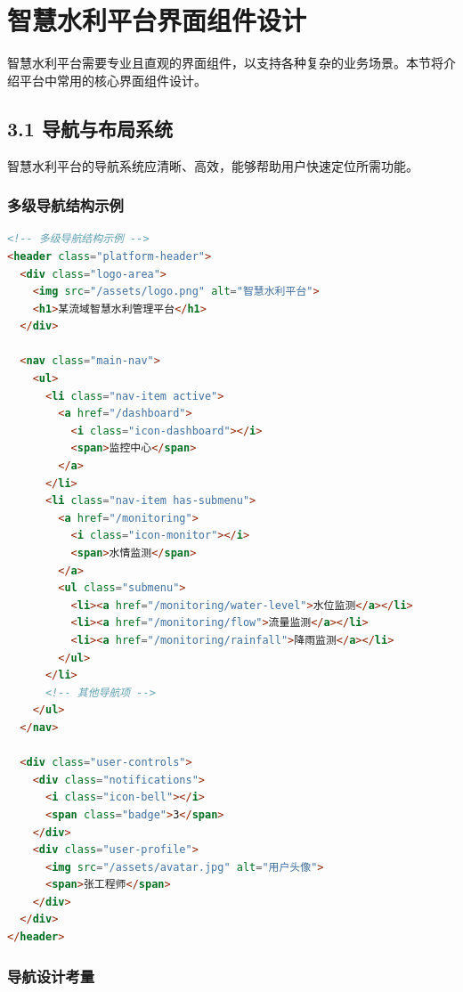 \section{智慧水利平台界面组件设计}\label{ux667aux6167ux6c34ux5229ux5e73ux53f0ux754cux9762ux7ec4ux4ef6ux8bbeux8ba1}

智慧水利平台需要专业且直观的界面组件，以支持各种复杂的业务场景。本节将介绍平台中常用的核心界面组件设计。

\subsection{3.1
导航与布局系统}\label{ux5bfcux822aux4e0eux5e03ux5c40ux7cfbux7edf}

智慧水利平台的导航系统应清晰、高效，能够帮助用户快速定位所需功能。

\subsubsection{多级导航结构示例}\label{ux591aux7ea7ux5bfcux822aux7ed3ux6784ux793aux4f8b}

\begin{lstlisting}[language=HTML]
<!-- 多级导航结构示例 -->
<header class="platform-header">
  <div class="logo-area">
    <img src="/assets/logo.png" alt="智慧水利平台">
    <h1>某流域智慧水利管理平台</h1>
  </div>
  
  <nav class="main-nav">
    <ul>
      <li class="nav-item active">
        <a href="/dashboard">
          <i class="icon-dashboard"></i>
          <span>监控中心</span>
        </a>
      </li>
      <li class="nav-item has-submenu">
        <a href="/monitoring">
          <i class="icon-monitor"></i>
          <span>水情监测</span>
        </a>
        <ul class="submenu">
          <li><a href="/monitoring/water-level">水位监测</a></li>
          <li><a href="/monitoring/flow">流量监测</a></li>
          <li><a href="/monitoring/rainfall">降雨监测</a></li>
        </ul>
      </li>
      <!-- 其他导航项 -->
    </ul>
  </nav>
  
  <div class="user-controls">
    <div class="notifications">
      <i class="icon-bell"></i>
      <span class="badge">3</span>
    </div>
    <div class="user-profile">
      <img src="/assets/avatar.jpg" alt="用户头像">
      <span>张工程师</span>
    </div>
  </div>
</header>
\end{lstlisting}

\subsubsection{导航设计考量}\label{ux5bfcux822aux8bbeux8ba1ux8003ux91cf}

